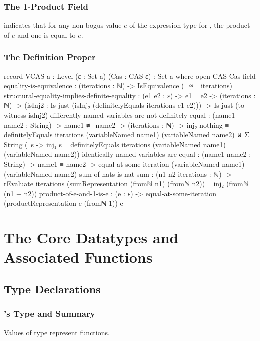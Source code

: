 \documentclass{report}
\begin{document}
\subsection{The 1-Product Field}
  indicates that for any non-bogus value \(e\) of the expression type for , the product of \(e\) and one is equal to \(e\).

\subsection{The Definition Proper}

\begin{code}
record VCAS {a : Level} (ε : Set a) (Cas : CAS ε) : Set a where
  open CAS Cas
  field
    equality-is-equivalence : (iterations : ℕ) -> IsEquivalence (_≈_ iterations)
    structural-equality-implies-definite-equality :
      (e1 e2 : ε) ->
      e1 ≡ e2 ->
      (iterations : ℕ) ->
      (isInj2 : Is-just (isInj₂ (definitelyEquals iterations e1 e2))) ->
      Is-just (to-witness isInj2)
    differently-named-variables-are-not-definitely-equal :
      (name1 name2 : String) ->
      name1 ≢ name2 ->
      (iterations : ℕ) ->
      inj₂ nothing ≡ definitelyEquals iterations (variableNamed name1) (variableNamed name2) ⊎
      Σ String (\ s -> inj₁ s ≡ definitelyEquals iterations (variableNamed name1) (variableNamed name2))
    identically-named-variables-are-equal :
      (name1 name2 : String) ->
      name1 ≡ name2 ->
      equal-at-some-iteration (variableNamed name1) (variableNamed name2)
    sum-of-nats-is-nat-sum :
      (n1 n2 iterations : ℕ) ->
      rEvaluate iterations (sumRepresentation (fromℕ n1) (fromℕ n2)) ≡
        inj₂ (fromℕ (n1 + n2))
    product-of-e-and-1-is-e :
      (e : ε) ->
      equal-at-some-iteration (productRepresentation e (fromℕ 1)) e
\end{code}

\chapter{The Core Datatypes and Associated Functions}

\section{Type Declarations}

\subsection{'s Type and Summary}
Values of type  represent functions.
\end{document}
